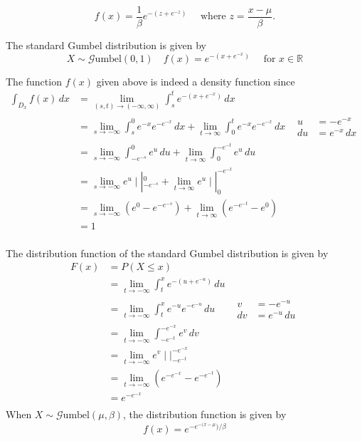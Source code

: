 \documentclass[titlepage,12 pt]{article}
\newcommand{\R}{{\mathbb R}}
\newcommand{\ds}{\displaystyle}
\begin{document}
\[\ds f(x)=\frac{1}{\beta}e^{-(z+e^{-z})} \quad \text{ where } z=\frac{x-\mu}{\beta}.
\]

The standard Gumbel distribution is given by
$$ X \sim \mathcal{G}\text{umbel}(0,1) \quad f(x) = e^{-(x + e^{-x})} \quad \text{ for } x \in \R $$

The function $f(x)$ given above is indeed a density function since
\begin{align*}
\int_{D_x} f(x) \, dx & = \lim_{(s,t)\to(-\infty,\infty)} \int_{s}^{t} e^{-(x+e^{-x})} \, dx \\[3 mm]
&= \lim_{s\to-\infty} \int_{s}^{0} e^{-x}e^{-e^{-x}} \, dx + \lim_{t\to\infty} \int_{0}^{t} e^{-x}e^{-e^{-x}} \, dx
& \boxed{\begin{aligned}u &= -e^{-x} \\
             du &= e^{-x} \, dx \end{aligned}} \\[3 mm]
&= \lim_{s\to-\infty} \int_{-e^{-s}}^{0} e^{u} \, du + \lim_{t\to\infty} \int_{0}^{-e^{-t}} e^{u} \, du \\[3 mm]
&= \lim_{s\to-\infty}  e^{u} \mid|_{-e^{-s}}^{0} + \lim_{t\to\infty} e^{u} \mid|_{0}^{-e^{-t}} \\[3 mm]
&= \lim_{s\to-\infty} (e^0-e^{-e^{-s}}) + \lim_{t\to\infty} (e^{-e^{-t}}-e^0) \\[3 mm]
&=1 \\
\end{align*}

The distribution function of the standard Gumbel distribution is given by
\begin{align*}
    F(x)& =P(X\leq x) \\[3mm]
    &=\lim_{t\to-\infty} \int_{t}^{x} e^{-(u + e^{-u})} \, du \\[3mm]
    &= \lim_{t\to-\infty} \int_{t}^{x} e^{-u}e^{-e^{-u}} \, du
& \boxed{\begin{aligned}v &= -e^{-u} \\
             dv &= e^{-u} \, du \end{aligned}} \\[3 mm]
    &= \lim_{t\to-\infty} \int_{-e^{-t}}^{-e^{-x}} e^{v} \, dv \\[3mm]
    &= \lim_{t\to-\infty} e^v \mid|_{-e^{-t}}^{-e^{-x}} \\[3mm]
    &= \lim_{t\to-\infty} (e^{-e^{-x}}-e^{-e^{-t}}) \\[3mm]
    &= e^{-e^{-x}} \\
\end{align*}
When $ X \sim \mathcal{G}\text{umbel}(\mu,\beta) $, the distribution function is given by
$$ f(x)=e^{-e^{-(x-\mu})/\beta} $$
\end{document}
